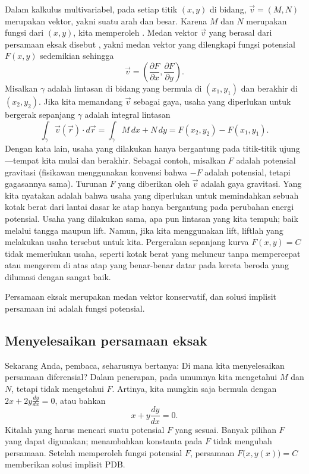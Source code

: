 Dalam kalkulus multivariabel, pada setiap titik $(x,y)$ di bidang,
$\vec{v} = (M,N)$ merupakan
vektor, yakni suatu arah dan besar.
Karena $M$ dan $N$ merupakan fungsi dari $(x,y)$, kita memperoleh \emph{}.
Medan vektor $\vec{v}$ yang berasal dari persamaan eksak disebut
\emph{}, yakni medan vektor yang dilengkapi
fungsi potensial $F(x,y)$ sedemikian sehingga
\begin{equation*}
\vec{v} = \left( \frac{\partial F}{\partial x} ,\frac{\partial F}{\partial
y} \right) .
\end{equation*}
Misalkan
$\gamma$ adalah lintasan di bidang yang bermula di $(x_1,y_1)$ dan berakhir di
$(x_2,y_2)$.
Jika kita memandang $\vec{v}$ sebagai gaya, usaha yang diperlukan untuk
bergerak sepanjang $\gamma$ adalah integral lintasan
\begin{equation*}
\int_\gamma \vec{v}(\vec{r}) \cdot d\vec{r}
=
\int_\gamma M \, dx + N \, dy
=
F(x_2,y_2) - F(x_1,y_1) .
\end{equation*}
Dengan kata lain, usaha yang dilakukan hanya bergantung pada
titik-titik ujung---tempat kita mulai dan berakhir.
Sebagai contoh, misalkan $F$ adalah potensial gravitasi
(fisikawan menggunakan konvensi bahwa $-F$ adalah potensial,
tetapi gagasannya sama).
Turunan $F$ yang diberikan oleh $\vec{v}$ adalah gaya gravitasi.
Yang kita
nyatakan adalah bahwa usaha yang diperlukan untuk memindahkan sebuah kotak berat dari lantai
dasar ke atap hanya bergantung pada perubahan energi potensial.
Usaha yang dilakukan sama,
apa pun lintasan yang kita tempuh; baik melalui tangga maupun lift.
Namun, jika kita menggunakan lift, liftlah yang melakukan usaha tersebut untuk kita.
Pergerakan sepanjang kurva $F(x,y) = C$ tidak memerlukan usaha, seperti
kotak berat yang meluncur tanpa mempercepat atau mengerem di atas atap yang benar-benar
datar pada kereta beroda yang dilumasi dengan sangat baik.

Persamaan eksak merupakan medan vektor konservatif, dan solusi implisit
persamaan ini adalah fungsi potensial.

\subsection{Menyelesaikan persamaan eksak}

Sekarang Anda, pembaca, seharusnya bertanya: Di mana kita menyelesaikan persamaan diferensial?
Dalam penerapan, pada umumnya kita mengetahui $M$ dan $N$, tetapi tidak
mengetahui $F$.  Artinya, kita mungkin saja bermula dengan
$2x + 2y \frac{dy}{dx} = 0$, atau bahkan
\begin{equation*}
x + y \frac{dy}{dx} = 0 .
\end{equation*}
Kitalah yang harus mencari suatu potensial $F$ yang sesuai.  Banyak pilihan $F$
yang dapat digunakan; menambahkan konstanta pada $F$ tidak mengubah persamaan.
Setelah memperoleh fungsi potensial $F$, persamaan
$F\bigl(x,y(x)\bigr) = C$
memberikan solusi implisit PDB\@.

